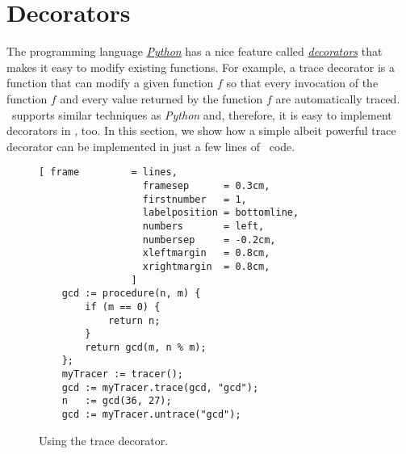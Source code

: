 \section{Decorators}
The programming language \href{https://www.python.org}{\textsl{Python}} has a nice feature called 
\href{http://en.wikipedia.org/wiki/Python_syntax_and_semantics#Decorators}{\emph{decorators}} that
makes it easy to modify existing functions.  For example, a trace decorator is a function that can
modify a given function $f$ so that every invocation of the function $f$ and every value returned by
the function $f$ are automatically traced.  \setlx\ supports similar techniques as \textsl{Python} and,
therefore, it is easy to implement decorators in \setlx, too.  In this section, we show how a simple
albeit powerful trace decorator can be implemented in just a few lines of \setlx\ code.

\begin{figure}[!ht]
\centering
\begin{Verbatim}[ frame         = lines, 
                  framesep      = 0.3cm, 
                  firstnumber   = 1,
                  labelposition = bottomline,
                  numbers       = left,
                  numbersep     = -0.2cm,
                  xleftmargin   = 0.8cm,
                  xrightmargin  = 0.8cm,
                ]
    gcd := procedure(n, m) {
        if (m == 0) {
            return n;
        }
        return gcd(m, n % m);
    };
    myTracer := tracer();
    gcd := myTracer.trace(gcd, "gcd");
    n   := gcd(36, 27);
    gcd := myTracer.untrace("gcd");
\end{Verbatim}
\vspace*{-0.3cm}
\caption{Using the trace decorator.}
\label{fig:tarce-decorator-use.stlx}
\end{figure}

